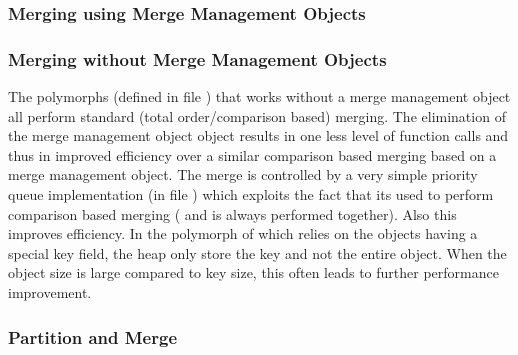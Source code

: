 \tobeextended


%

\subsubsection{Merging using Merge Management Objects}

\tobeextended


\subsubsection{Merging without Merge Management Objects}

\tobeextended

The  polymorphs (defined in file
) that works without a merge management object
all perform standard (total order/comparison based) merging. The
elimination of the merge management object object results in one less level
of function calls and thus in improved efficiency over a similar comparison
based merging based on a merge management object. The merge is controlled
by a very simple priority queue implementation (in file )
which exploits the fact that its used to perform comparison based merging
( and  is always performed together). Also
this improves efficiency. In the polymorph of  which
relies on the objects having a special key field, the heap only store the
key and not the entire object. When the object size is large compared to
key size, this often leads to further performance improvement.

\subsubsection{Partition and Merge}

